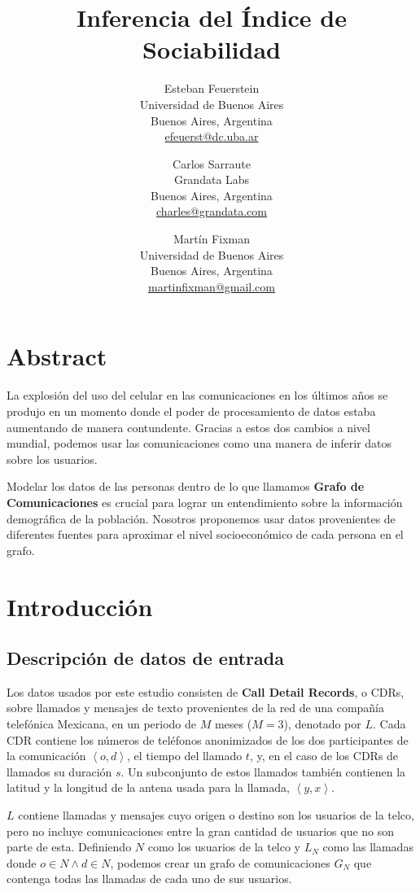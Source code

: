 \documentclass[
10pt,
spanish,
singlespacing, %
parskip, %
headsepline, %
twocolumn
]{article} %
\title{Inferencia del Índice de Sociabilidad}
\author{
	\hspace{-1.725cm} Esteban Feuerstein\\
	\hspace{-1.725cm} Universidad de Buenos Aires\\
	\hspace{-1.725cm} Buenos Aires, Argentina\\
	\hspace{-1.725cm} \url{efeuerst@dc.uba.ar}
	\and
	Carlos Sarraute\\
	Grandata Labs\\
	Buenos Aires, Argentina\\
	\url{charles@grandata.com}
	\and
	Martín Fixman\\
	Universidad de Buenos Aires\\
	Buenos Aires, Argentina\\
	\url{martinfixman@gmail.com}
}
\date{}
\begin{document}
\maketitle

\section{Abstract}

La explosión del uso del celular en las comunicaciones en los últimos años se produjo en un momento donde el poder de procesamiento de datos estaba aumentando de manera contundente. Gracias a estos dos cambios a nivel mundial, podemos usar las comunicaciones como una manera de inferir datos sobre los usuarios.

Modelar los datos de las personas dentro de lo que llamamos \textbf{Grafo de Comunicaciones} es crucial para lograr un entendimiento sobre la información demográfica de la población. Nosotros proponemos usar datos provenientes de diferentes fuentes para aproximar el nivel socioeconómico de cada persona en el grafo.

\section{Introducción}


\subsection*{Descripción de datos de entrada}

Los datos usados por este estudio consisten de \textbf{Call Detail Records}, o CDRs, sobre llamados y mensajes de texto provenientes de la red de una compañía telefónica Mexicana, en un periodo de \( M \) meses (\( M = 3 \)), denotado por \( L \). Cada CDR contiene los números de teléfonos anonimizados de los dos participantes de la comunicación \(\left<o, d\right>\), el tiempo del llamado \(t\), y, en el caso de los CDRs de llamados su duración \(s\). Un subconjunto de estos llamados también contienen la latitud y la longitud de la antena usada para la llamada, \(\left<y, x\right>\).

\( L \) contiene llamadas y mensajes cuyo origen o destino son los usuarios de la telco, pero no incluye comunicaciones entre la gran cantidad de usuarios que no son parte de esta. Definiendo \( N \) como los usuarios de la telco y \( L_N \) como las llamadas donde \( o \in N \wedge d \in N \), podemos crear un grafo de comunicaciones \( G_N \) que contenga todas las llamadas de cada uno de sus usuarios.
\end{document}
